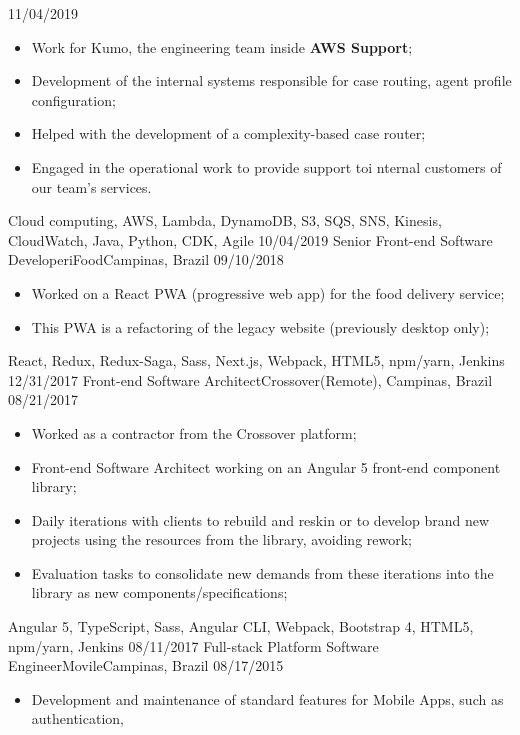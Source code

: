 \begin{experiences}
    {11/04/2019} {
    \begin{itemize}
      \item Work for Kumo, the engineering team inside \textbf{AWS Support};
      \item Development of the internal systems responsible for case routing, agent profile configuration;
      \item Helped with the development of a complexity-based case router;
      \item Engaged in the operational work to provide support toi nternal customers of our team's services.
    \end{itemize}
  }
  {Cloud computing, AWS, Lambda, DynamoDB, S3, SQS, SNS, Kinesis, CloudWatch, Java, Python, CDK, Agile }
  \emptySeparator
  \experience
  {10/04/2019}   {Senior Front-end Software Developer}{iFood}{Campinas, Brazil}
  {09/10/2018} {
  \begin{itemize}
    \item Worked on a React PWA (progressive web app) for the food delivery service;
    \item This PWA is a refactoring of the legacy website (previously desktop only);
  \end{itemize}
}
{React, Redux, Redux-Saga, Sass, Next.js, Webpack, HTML5, npm/yarn, Jenkins}
\emptySeparator
  \experience
    {12/31/2017}   {Front-end Software Architect}{Crossover}{(Remote), Campinas, Brazil}
    {08/21/2017} {
    \begin{itemize}
      \item Worked as a contractor from the Crossover platform;
      \item Front-end Software Architect working on an Angular 5 front-end component library;
      \item Daily iterations with clients to rebuild and reskin or to develop brand new projects using the resources from the library, avoiding rework;
      \item Evaluation tasks to consolidate new demands from these iterations into the library as new components/specifications;
    \end{itemize}
  }
  {Angular 5, TypeScript, Sass, Angular CLI, Webpack, Bootstrap 4, HTML5, npm/yarn, Jenkins}
  \emptySeparator
  \experience
    {08/11/2017}   {Full-stack Platform Software Engineer}{Movile}{Campinas, Brazil}
    {08/17/2015} {
    \begin{itemize}
      \item Development and maintenance of standard features for Mobile Apps, such as authentication,

\end{itemize}}
\end{experiences}
